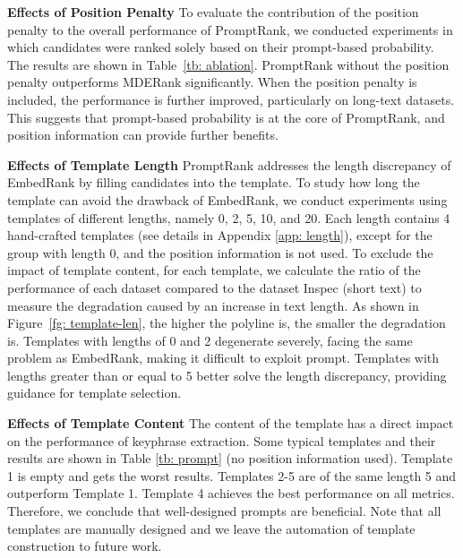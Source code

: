 \documentclass[11pt]{article}
\begin{document}
{\bf Effects of Position Penalty} To evaluate the contribution of the position penalty to the overall performance of PromptRank, we conducted experiments in which candidates were ranked solely based on their prompt-based probability. The results are shown in Table~\ref{tb: ablation}. PromptRank without the position penalty outperforms MDERank significantly. When the position penalty is included, the performance is further improved, particularly on long-text datasets. This suggests that prompt-based probability is at the core of PromptRank, and position information can provide further benefits.

\noindent
{\bf Effects of Template Length} PromptRank addresses the length discrepancy of EmbedRank by filling candidates into the template. To study how long the template can avoid the drawback of EmbedRank, we conduct experiments using templates of different lengths, namely 0, 2, 5, 10, and 20. Each length contains 4 hand-crafted templates (see details in Appendix \ref{app: length}), except for the group with length 0, and the position information is not used. To exclude the impact of template content, for each template, we calculate the ratio of the performance of each dataset compared to the dataset Inspec (short text) to measure the degradation caused by an increase in text length. As shown in Figure~\ref{fg: template-len}, the higher the polyline is, the smaller the degradation is. Templates with lengths of 0 and 2 degenerate severely, facing the same problem as EmbedRank, making it difficult to exploit prompt. Templates with lengths greater than or equal to 5 better solve the length discrepancy, providing guidance for template selection.

\noindent
{\bf Effects of Template Content}
The content of the template has a direct impact on the performance of keyphrase extraction. Some typical templates and their results are shown in Table \ref{tb: prompt} (no position information used). Template 1 is empty and gets the worst results. Templates 2-5 are of the same length 5 and outperform Template 1. Template 4 achieves the best performance on all metrics. Therefore, we conclude that well-designed prompts are beneficial. Note that all templates are manually designed and we leave the automation of template construction to future work.
\end{document}
